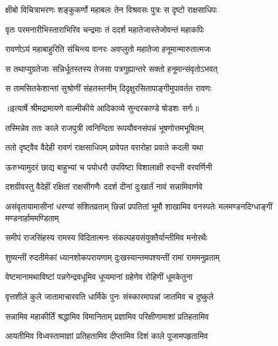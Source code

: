 \twolineshloka
{क्षीबो विचित्राभरणः शङ्कुकर्णो महाबलः}
{तेन विश्रवसः पुत्रः स दृष्टो राक्षसाधिपः} %

\twolineshloka
{वृतः परमनारीभिस्ताराभिरिव चन्द्रमाः}
{तं ददर्श महातेजास्तेजोवन्तं महाकपिः} %

\twolineshloka
{रावणोऽयं महाबाहुरिति संचिन्त्य वानरः}
{अवप्लुतो महातेजा हनूमान्मारुतात्मजः} %

\twolineshloka
{स तथाप्युग्रतेजाः सन्निर्धूतस्तस्य तेजसा}
{पत्रगुह्यान्तरे सक्तो हनूमान्संवृतोऽभवत्} %

\twolineshloka
{स तामसितकेशान्तां सुश्रोणीं संहतस्तनीम्}
{दिदृक्षुरसितापाङ्गीमुपावर्तत रावणः} %


{॥इत्यार्षे श्रीमद्रामायणे वाल्मीकीये आदिकाव्ये सुन्दरकाण्डे षोडशः सर्गः॥}


\twolineshloka
{तस्मिन्नेव ततः काले राजपुत्री त्वनिन्दिता}
{रूपयौवनसंपन्नं भूषणोत्तमभूषितम्} %

\twolineshloka
{ततो दृष्ट्वैव वैदेही रावणं राक्षसाधिपम्}
{प्रावेपत वरारोहा प्रवाते कदली यथा} %

\twolineshloka
{ऊरुभ्यामुदरं छाद्य बाहुभ्यां च पयोधरौ}
{उपविष्टा विशालाक्षी रुदन्ती वरवर्णिनी} %

\twolineshloka
{दशग्रीवस्तु वैदेहीं रक्षितां राक्षसीगणैः}
{ददर्श दीनां दुःखार्तं नावं सन्नामिवार्णवे} %

\threelineshloka
{असंवृतायामासीनां धरण्यां संशितव्रताम्}
{छिन्नां प्रपतितां भूमौ शाखामिव वनस्पतेः}
{मलमण्डनदिग्धाङ्गीं मण्डनार्हाममण्डिताम्} %

\twolineshloka
{समीपं राजसिंहस्य रामस्य विदितात्मनः}
{संकल्पहयसंयुक्तैर्यान्तीमिव मनोरथैः} %

\twolineshloka
{शुष्यन्तीं रुदतीमेकां ध्यानशोकपरायणाम्}
{दुःखस्यान्तमपश्यन्तीं रामां राममनुव्रताम्} %

\twolineshloka
{वेष्टमानामथाविष्टां पन्नगेन्द्रवधूमिव}
{धूप्यमानां ग्रहेणेव रोहिणीं धूमकेतुना} %

\twolineshloka
{वृत्तशीले कुले जातामाचारवति धार्मिके}
{पुनः संस्कारमापन्नां जातमिव च दुष्कुले} %

\twolineshloka
{सन्नामिव महाकीर्तिं श्रद्धामिव विमानिताम्}
{प्रज्ञामिव परिक्षीणामाशां प्रतिहतामिव} %

\twolineshloka
{आयतीमिव विध्वस्तामाज्ञां प्रतिहतामिव}
{दीप्तामिव दिशं काले पूजामपहृतामिव} %

